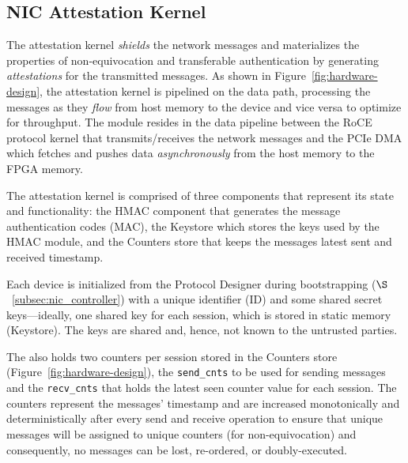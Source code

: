 \subsection{NIC Attestation Kernel}
\label{subsec:nic_attest_kernel}
The attestation kernel {\em shields} the network messages and materializes the properties of non-equivocation and transferable authentication by generating {\em attestations} for the transmitted messages. As shown in Figure~\ref{fig:hardware-design}, the attestation kernel is pipelined on the data path, processing the messages as they {\em flow} from host memory to the device and vice versa to optimize for throughput. The module resides in the data pipeline between the RoCE protocol kernel that transmits/receives the network messages and the PCIe DMA which fetches and pushes data {\em asynchronously} from the host memory to the FPGA memory.


 The attestation kernel is comprised of three components that represent its state and functionality: the HMAC component that generates the message authentication codes (MAC), the Keystore which stores the keys used by the HMAC module, and the Counters store that keeps the messages latest sent and received timestamp. 

Each \projecttitle{} device is initialized from the Protocol Designer during bootstrapping ($\S$~\ref{subsec:nic_controller}) with a unique identifier (ID) and some shared secret keys---ideally, one shared key for each session, which is stored in static memory (Keystore). The keys are shared and, hence, not known to the untrusted parties. %

The \projecttitle{} also holds two counters per session stored in the Counters store (Figure~\ref{fig:hardware-design}), the {\tt send\_cnts} to be used for sending messages and the \texttt{recv\_cnts} that holds the latest seen counter value for each session. The counters represent the messages' timestamp and are increased monotonically and deterministically after every send and receive operation to ensure that unique messages will be assigned to unique counters (for non-equivocation) and consequently, no messages can be lost, re-ordered, or doubly-executed.




